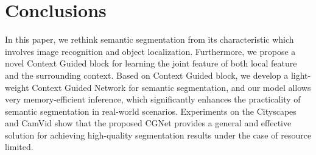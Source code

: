 \documentclass[10pt,twocolumn,letterpaper]{article}
\begin{document}
\section{Conclusions}
In this paper, we rethink semantic segmentation from its characteristic which involves image recognition and object localization. Furthermore, we propose a novel Context Guided block for learning the joint feature of both local feature and the surrounding context. Based on Context Guided block, we develop a light-weight Context Guided Network for semantic segmentation, and our model allows very memory-efficient inference, which significantly enhances the practicality of semantic segmentation in real-world scenarios. Experiments on the Cityscapes and CamVid show that the proposed CGNet provides a general and effective solution for achieving high-quality segmentation results under the case of resource limited.



{\small


}
\end{document}

